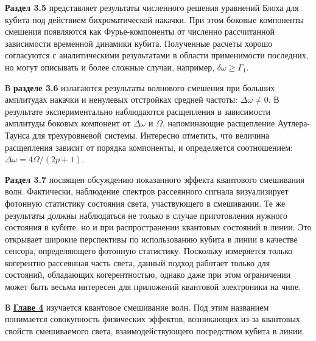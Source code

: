 \textbf{Раздел 3.5} представляет результаты численного решения уравнений Блоха для кубита под действием бихроматической накачки. При этом боковые компоненты смешения появляются как Фурье-компоненты от численно рассчитанной зависимости временной динамики кубита. Полученные расчеты хорошо согласуются с аналитическими результатами в области применимости последних, но могут описывать и более сложные случаи, например, $\delta\omega\ge \Gamma_1$.

В \textbf{разделе 3.6} излагаются результаты волнового смешения при больших амплитудах накачки и ненулевых отстройках средней частоты: $\Delta\omega \ne 0$. В результате экспериментально наблюдаются расщепления в зависимости амплитуды боковых компонент от $\Delta\omega$ и $\Omega$, напоминающие расщепление Аутлера-Таунса для трехуровневой системы. Интересно отметить, что величина расщепления зависит от порядка компоненты, и определяется соотношением: $\Delta\omega=4\Omega/(2p+1)$.

\textbf{Раздел 3.7} посвящен обсуждению показанного эффекта квантового смешивания волн. Фактически, наблюдение спектров рассеянного сигнала визуализирует фотонную статистику состояния света, участвующего в смешивании. Те же результаты должны наблюдаться не только в случае приготовления нужного состояния в кубите, но и при распространении квантовых состояний в линии. Это открывает широкие перспективы по использованию кубита в линии в качестве сенсора, определяющего фотонную статистику. Поскольку измеряется только когерентно рассеянная часть света, данный подход работает только для состояний, обладающих когерентностью, однако даже при этом ограничении может быть весьма интересен для приложений квантовой электроники на чипе.

В \underline{\textbf{Главе 4}} изучается квантовое смешивание волн. Под этим названием понимается совокупность  физических эффектов, возникающих из-за квантовых свойств смешиваемого света, взаимодействующего посредством кубита в линии. 

